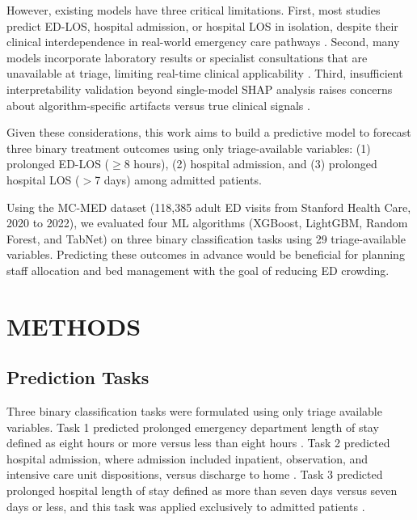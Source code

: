 \documentclass[harvard,article]{frontiersinFPHY_FAMS}
\begin{document}
However, existing models have three critical limitations. First, most studies predict ED-LOS, hospital admission, or hospital LOS in isolation, despite their clinical interdependence in real-world emergency care pathways \cite{stone2022}. Second, many models incorporate laboratory results or specialist consultations that are unavailable at triage, limiting real-time clinical applicability \cite{levin2020}. Third, insufficient interpretability validation beyond single-model SHAP analysis raises concerns about algorithm-specific artifacts versus true clinical signals \cite{slack2022, wang2025}.

Given these considerations, this work aims to build a predictive model to forecast three binary treatment outcomes using only triage-available variables: (1) prolonged ED-LOS ($\geq$8 hours), (2) hospital admission, and (3) prolonged hospital LOS ($>$7 days) among admitted patients.

Using the MC-MED dataset (118,385 adult ED visits from Stanford Health Care, 2020 to 2022), we evaluated four ML algorithms (XGBoost, LightGBM, Random Forest, and TabNet) on three binary classification tasks using 29 triage-available variables. Predicting these outcomes in advance would be beneficial for planning staff allocation and bed management with the goal of reducing ED crowding.

\section{METHODS}


\subsection{Prediction Tasks}

Three binary classification tasks were formulated using only triage available variables. Task 1 predicted prolonged emergency department length of stay defined as eight hours or more versus less than eight hours \cite{sun2013, farimani2024}. Task 2 predicted hospital admission, where admission included inpatient, observation, and intensive care unit dispositions, versus discharge to home \cite{kansal2025, fenn2021}. Task 3 predicted prolonged hospital length of stay defined as more than seven days versus seven days or less, and this task was applied exclusively to admitted patients \cite{stone2022, gokhale2023}.
\end{document}
